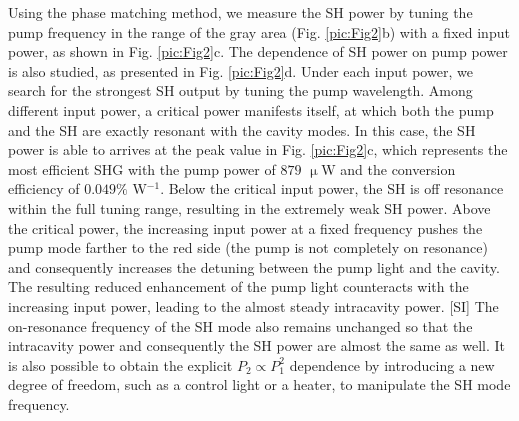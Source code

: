 \documentclass[a4paper,8pt,hyperref, twocolumn]{article}
\begin{document}
Using the phase matching method, we measure the SH power by tuning the pump frequency in the range of the gray area (Fig. \ref{pic:Fig2}b) with a fixed input power, as shown in Fig. \ref{pic:Fig2}c. %
The dependence of SH power on pump power is also studied, as presented in Fig. \ref{pic:Fig2}d. 
Under each input power, we search for the strongest SH output by tuning the pump wavelength. %
Among different input power, a critical power manifests itself, at which both the pump and the SH are exactly resonant with the cavity modes. %
In this case, the SH power is able to arrives at the peak value in Fig. \ref{pic:Fig2}c, which represents the most efficient SHG with the pump power of $879$ $\upmu$W and the conversion efficiency of $0.049\%$ W$^{-1}$.
Below the critical input power, the SH is off resonance within the full tuning range, resulting in the extremely weak SH power.
Above the critical power, the increasing input power at a fixed frequency pushes the pump mode farther to the red side (the pump is not completely on resonance) and consequently increases the detuning between the pump light and the cavity.
The resulting reduced enhancement of the pump light counteracts with the increasing input power, leading to the almost steady intracavity power. [SI]
The on-resonance frequency of the SH mode also remains unchanged so that the intracavity power and consequently the SH power are almost the same as well.
It is also possible to obtain the explicit $P_2 \propto P_1^2$ dependence by introducing a new degree of freedom, such as a control light or a heater, to manipulate the SH mode frequency. 
\end{document}

